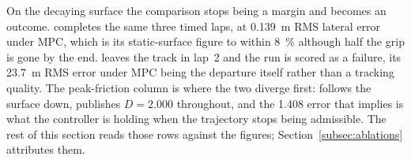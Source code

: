 On the decaying surface the comparison stops being a margin and becomes an
outcome. \oursarm{} completes the same three timed laps, at
\SI{0.139}{\meter} RMS lateral error under MPC, which is its static-surface
figure to within \SI{8}{\percent} although half the grip is gone by the end.
\basearm{} leaves the track in lap~2 and the run is scored as a failure, its
\SI{23.7}{\meter} RMS error under MPC being the departure itself rather than a
tracking quality. The peak-friction column is where the two diverge first:
\oursarm{} follows the surface down, \basearm{} publishes $D=\num{2.000}$
throughout, and the \num{1.408} error that implies is what the controller is
holding when the trajectory stops being admissible. The rest of this section
reads those rows against the figures; Section~\ref{subsec:ablations} attributes
them.


